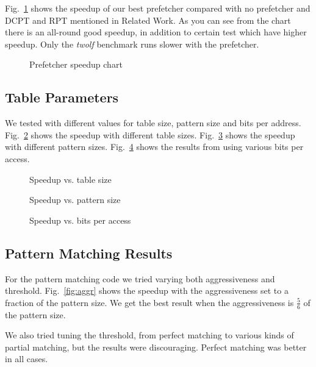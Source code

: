 Fig.~\ref{fig:prefetcher_speedup} shows the speedup of our best prefetcher
compared with no prefetcher and DCPT and RPT mentioned in Related Work.
As you can see from the
chart there is an all-round good speedup, in addition to certain test which
have higher speedup. Only the \emph{twolf} benchmark runs slower with the
prefetcher.

\begin{figure}
	
	\caption{Prefetcher speedup chart}
	\label{fig:prefetcher_speedup}
\end{figure}

\subsection{Table Parameters}
We tested with different values for table size, pattern size and bits per address.
Fig.~\ref{fig:table_size_chart} shows the speedup with different table sizes.
Fig.~\ref{fig:pattern_size} shows the speedup with different pattern sizes.
Fig.~\ref{fig:bits} shows the results from using various bits per access.

\begin{figure}
	
	\caption{Speedup vs. table size}
	\label{fig:table_size_chart}
\end{figure}

\begin{figure}
	
	\caption{Speedup vs. pattern size}
	\label{fig:pattern_size}
\end{figure}

\begin{figure}
	
	\caption{Speedup vs. bits per access}
	\label{fig:bits}
\end{figure}

\subsection{Pattern Matching Results}
For the pattern matching code we tried varying both aggressiveness and
threshold. Fig.~\ref{fig:aggr} shows the speedup with the aggressiveness set to
a fraction of the pattern size. We get the best result when the aggressiveness
is $\frac{5}{6}$ of the pattern size.

We also tried tuning the threshold, from perfect matching to various kinds of
partial matching, but the results were discouraging. Perfect matching was
better in all cases.

